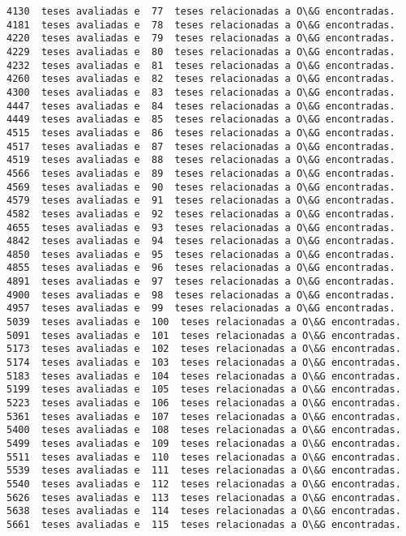 \documentclass[11pt]{article}
\begin{document}
\begin{Verbatim}[commandchars=\\\{\}]
4130  teses avaliadas e  77  teses relacionadas a O\&G encontradas.
4181  teses avaliadas e  78  teses relacionadas a O\&G encontradas.
4220  teses avaliadas e  79  teses relacionadas a O\&G encontradas.
4229  teses avaliadas e  80  teses relacionadas a O\&G encontradas.
4232  teses avaliadas e  81  teses relacionadas a O\&G encontradas.
4260  teses avaliadas e  82  teses relacionadas a O\&G encontradas.
4300  teses avaliadas e  83  teses relacionadas a O\&G encontradas.
4447  teses avaliadas e  84  teses relacionadas a O\&G encontradas.
4449  teses avaliadas e  85  teses relacionadas a O\&G encontradas.
4515  teses avaliadas e  86  teses relacionadas a O\&G encontradas.
4517  teses avaliadas e  87  teses relacionadas a O\&G encontradas.
4519  teses avaliadas e  88  teses relacionadas a O\&G encontradas.
4566  teses avaliadas e  89  teses relacionadas a O\&G encontradas.
4569  teses avaliadas e  90  teses relacionadas a O\&G encontradas.
4579  teses avaliadas e  91  teses relacionadas a O\&G encontradas.
4582  teses avaliadas e  92  teses relacionadas a O\&G encontradas.
4655  teses avaliadas e  93  teses relacionadas a O\&G encontradas.
4842  teses avaliadas e  94  teses relacionadas a O\&G encontradas.
4850  teses avaliadas e  95  teses relacionadas a O\&G encontradas.
4855  teses avaliadas e  96  teses relacionadas a O\&G encontradas.
4891  teses avaliadas e  97  teses relacionadas a O\&G encontradas.
4900  teses avaliadas e  98  teses relacionadas a O\&G encontradas.
4957  teses avaliadas e  99  teses relacionadas a O\&G encontradas.
5039  teses avaliadas e  100  teses relacionadas a O\&G encontradas.
5091  teses avaliadas e  101  teses relacionadas a O\&G encontradas.
5173  teses avaliadas e  102  teses relacionadas a O\&G encontradas.
5174  teses avaliadas e  103  teses relacionadas a O\&G encontradas.
5183  teses avaliadas e  104  teses relacionadas a O\&G encontradas.
5199  teses avaliadas e  105  teses relacionadas a O\&G encontradas.
5223  teses avaliadas e  106  teses relacionadas a O\&G encontradas.
5361  teses avaliadas e  107  teses relacionadas a O\&G encontradas.
5400  teses avaliadas e  108  teses relacionadas a O\&G encontradas.
5499  teses avaliadas e  109  teses relacionadas a O\&G encontradas.
5511  teses avaliadas e  110  teses relacionadas a O\&G encontradas.
5539  teses avaliadas e  111  teses relacionadas a O\&G encontradas.
5540  teses avaliadas e  112  teses relacionadas a O\&G encontradas.
5626  teses avaliadas e  113  teses relacionadas a O\&G encontradas.
5638  teses avaliadas e  114  teses relacionadas a O\&G encontradas.
5661  teses avaliadas e  115  teses relacionadas a O\&G encontradas.

\end{Verbatim}
\end{document}
